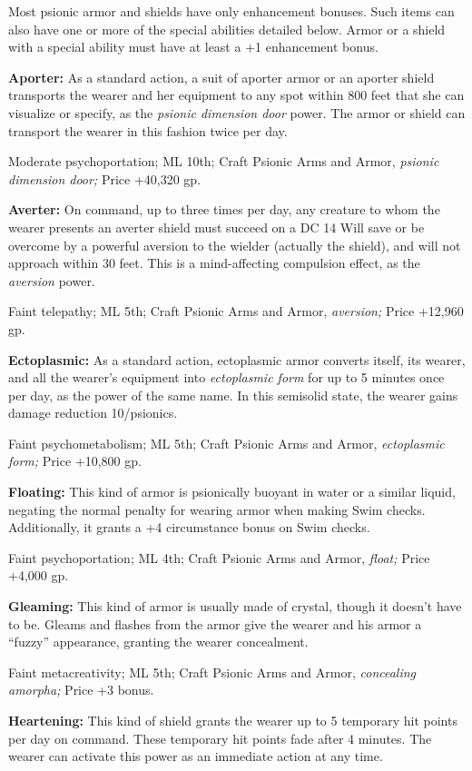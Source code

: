 \documentclass{article}
\begin{document}
Most psionic armor and shields have only enhancement bonuses. Such items can also 
have one or more of the special abilities detailed below. Armor or a shield with 
a special ability must have at least a +1 enhancement bonus. 

\textbf{Aporter:} As a standard action, a suit of aporter armor or an aporter shield 
transports the wearer and her equipment to any spot within 800 feet that she can 
visualize or specify, as the \textit{psionic dimension door }power. The armor or 
shield can transport the wearer in this fashion twice per day.

Moderate psychoportation; ML 10th; Craft Psionic Arms and Armor, \textit{psionic 
dimension door; }Price +40,320 gp.

\textbf{Averter:} On command, up to three times per day, any creature to whom the 
wearer presents an averter shield must succeed on a DC 14 Will save or be overcome 
by a powerful aversion to the wielder (actually the shield), and will not approach 
within 30 feet. This is a mind-affecting compulsion effect, as the \textit{aversion 
}power.

Faint telepathy; ML 5th; Craft Psionic Arms and Armor, \textit{aversion; }Price 
+12,960 gp.

\textbf{Ectoplasmic:} As a standard action, ectoplasmic armor converts itself, 
its wearer, and all the wearer's equipment into \textit{ectoplasmic form }for up 
to 5 minutes once per day, as the power of the same name. In this semisolid state, 
the wearer gains damage reduction 10/psionics.

Faint psychometabolism; ML 5th; Craft Psionic Arms and Armor, \textit{ectoplasmic 
form; }Price +10,800 gp.

\textbf{Floating:} This kind of armor is psionically buoyant in water or a similar 
liquid, negating the normal penalty for wearing armor when making Swim checks. 
Additionally, it grants a +4 circumstance bonus on Swim checks.

Faint psychoportation; ML 4th; Craft Psionic Arms and Armor, \textit{float; }Price 
+4,000 gp.

\textbf{Gleaming:} This kind of armor is usually made of crystal, though it doesn't 
have to be. Gleams and flashes from the armor give the wearer and his armor a ``fuzzy'' 
appearance, granting the wearer concealment.

Faint metacreativity; ML 5th; Craft Psionic Arms and Armor, \textit{concealing 
amorpha; }Price +3 bonus.

\textbf{Heartening: }This kind of shield grants the wearer up to 5 temporary hit 
points per day on command. These temporary hit points fade after 4 minutes. The 
wearer can activate this power as an immediate action at any time.
\end{document}
